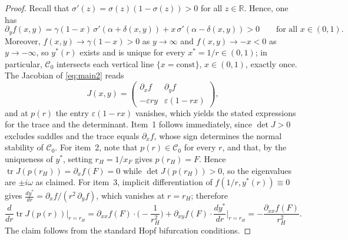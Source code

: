 \documentclass[3p]{elsarticle}
\theoremstyle{plain}
\theoremstyle{remark}
\theoremstyle{definition}
\begin{document}
\begin{proof}
Recall that $\sigma'(z)=\sigma(z)\left(1-\sigma(z)\right)>0$ for all
$z\in\mathbb{R}$. Hence, one has
\begin{equation*}
\partial_y f(x,y)=\gamma(1-x)\,\sigma'(\alpha+\delta(x,y))
+x\,\sigma'(\alpha-\delta(x,y))>0
\qquad \text{for all } x\in(0,1).
\end{equation*}
Moreover, $f(x,y)\to\gamma(1-x)>0$ as $y\to\infty$ and
$f(x,y)\to -x<0$ as $y\to-\infty$, so $y^{*}(r)$ exists and is unique
for every $x^{*}=1/r\in(0,1)$; in particular, $\mathcal{C}_0$ intersects
each vertical line $\{x=\mathrm{const}\}$, $x\in(0,1)$, exactly once.
The Jacobian of \eqref{eq:main2} reads
\begin{equation*}
J(x,y)=\begin{pmatrix}
\partial_x f & \partial_y f\\[2pt]
-\varepsilon r y & \varepsilon(1-rx)
\end{pmatrix},
\end{equation*}
and at $p(r)$ the entry $\varepsilon(1-rx)$ vanishes, which yields the
stated expressions for the trace and the determinant. Item~1 follows
immediately, since $\det J>0$ excludes saddles and the trace equals
$\partial_x f$, whose sign determines the normal stability of
$\mathcal{C}_0$. For item~2, note that $p(r)\in\mathcal{C}_0$ for every
$r$, and that, by the uniqueness of $y^{*}$, setting $r_H=1/x_F$ gives
$p(r_H)=F$. Hence $\operatorname{tr}J(p(r_H))=\partial_x f(F)=0$ while
$\det J(p(r_H))>0$, so the eigenvalues are $\pm i\omega$ as claimed.
For item~3, implicit differentiation of $f(1/r,y^{*}(r))\equiv 0$ gives
$\frac{dy^{*}}{dr}=\partial_x f/\left(r^{2}\,\partial_y f\right)$,
which vanishes at $r=r_H$; therefore
\begin{equation*}
\frac{d}{dr}\operatorname{tr}J(p(r))\Big\vert_{r=r_H}
=\partial_{xx}f(F)\cdot\Big(-\frac{1}{r_H^{2}}\Big)
+\partial_{xy}f(F)\cdot\frac{dy^{*}}{dr}\Big\vert_{r=r_H}
=-\frac{\partial_{xx}f(F)}{r_H^{2}}.
\end{equation*}
The claim follows from the standard Hopf bifurcation conditions.
\end{proof}
\end{document}
